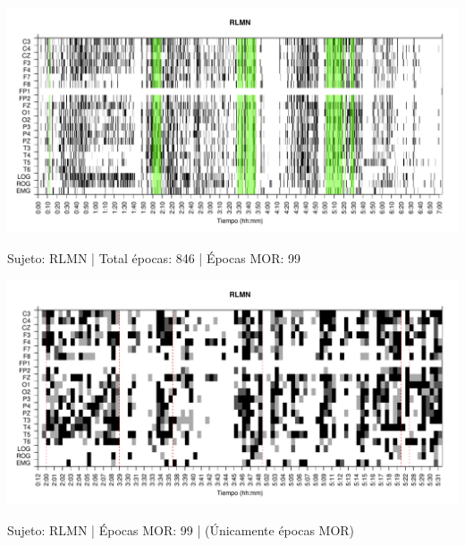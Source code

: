 
\begin{SidewaysFigure}
\centering
\includegraphics[width=\linewidth]{./material_bonito170220/RLMN10SUE_99_mor99_tot846_est_total.pdf} 
\caption{Sujeto: RLMN | Total \'epocas: 846 | \'Epocas MOR: 99}
\end{SidewaysFigure}
\begin{SidewaysFigure}
\centering
\includegraphics[width=\linewidth]
{./material_bonito170220/RLMN10SUE_99_mor99_tot99_est_mor.pdf} 
\caption{Sujeto: RLMN | \'Epocas MOR: 99 | (\'Unicamente \'epocas MOR)}
\end{SidewaysFigure}


